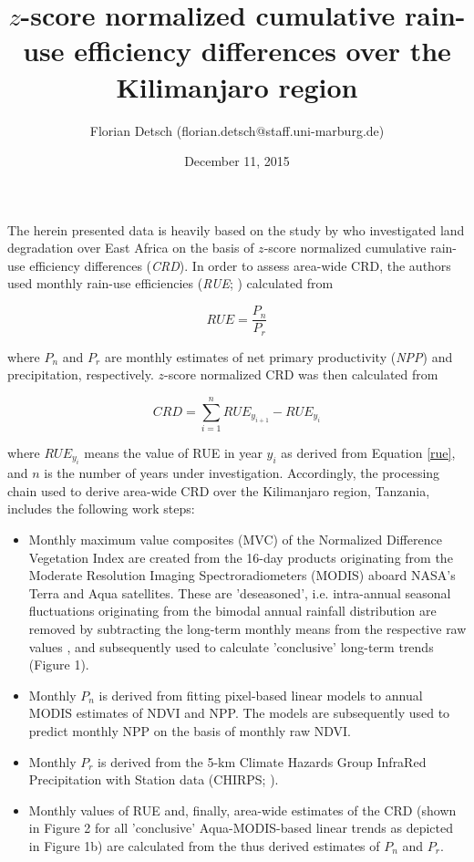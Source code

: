 \documentclass{article}
\title{$z$-score normalized cumulative rain-use efficiency differences over the Kilimanjaro region}
\author{Florian Detsch (florian.detsch@staff.uni-marburg.de)}
\date{December 11, 2015}
\begin{document}
\maketitle

The herein presented data is heavily based on the study by \citet{Landmann2014} who investigated land degradation over East Africa on the basis of $z$-score normalized cumulative rain-use efficiency differences (\textit{CRD}). In order to assess area-wide CRD, the authors used monthly rain-use efficiencies (\textit{RUE}; \cite{Prince1998a}) calculated from 

\begin{equation}
\label{rue}
\textit{RUE} = \frac{P_n}{P_r}
\end{equation}

where $P_n$ and $P_r$ are monthly estimates of net primary productivity (\textit{NPP}) and precipitation, respectively. $z$-score normalized CRD was then calculated from 

\begin{equation}
\textit{CRD} = \sum \limits_{i=1}^n \textit{RUE}_{y_{i+1}} - \textit{RUE}_{y_{i}}
\end{equation}

where $\textit{RUE}_{y_{i}}$ means the value of RUE in year $y_{i}$ as derived from Equation \ref{rue}, and $n$ is the number of years under investigation. Accordingly, the processing chain used to derive area-wide CRD over the Kilimanjaro region, Tanzania, includes the following work steps:

\begin{itemize}
\item Monthly maximum value composites (MVC) of the Normalized Difference Vegetation Index \citep[NDVI;][]{Tucker1979} are created from the 16-day products originating from the Moderate Resolution Imaging Spectroradiometers (MODIS) aboard NASA's Terra and Aqua satellites. These are 'deseasoned', i.e. intra-annual seasonal fluctuations originating from the bimodal annual rainfall distribution \citep{Otte2015} are removed by subtracting the long-term monthly means from the respective raw values \citep{Appelhans2015b}, and subsequently used to calculate 'conclusive' \cite[$p<0.001$;][]{Miller1966} long-term trends (Figure 1).

\item Monthly $P_n$ is derived from fitting pixel-based linear models to annual MODIS estimates of NDVI and NPP. The models are subsequently used to predict monthly NPP on the basis of monthly raw NDVI.

\item Monthly $P_r$ is derived from the 5-km Climate Hazards Group InfraRed Precipitation with Station data (CHIRPS; \citep{Funk2015}). 

\item Monthly values of RUE and, finally, area-wide estimates of the CRD (shown in Figure 2 for all 'conclusive' Aqua-MODIS-based linear trends as depicted in Figure 1b) are calculated from the thus derived estimates of $P_n$ and $P_r$. 
\end{itemize}
\end{document}
